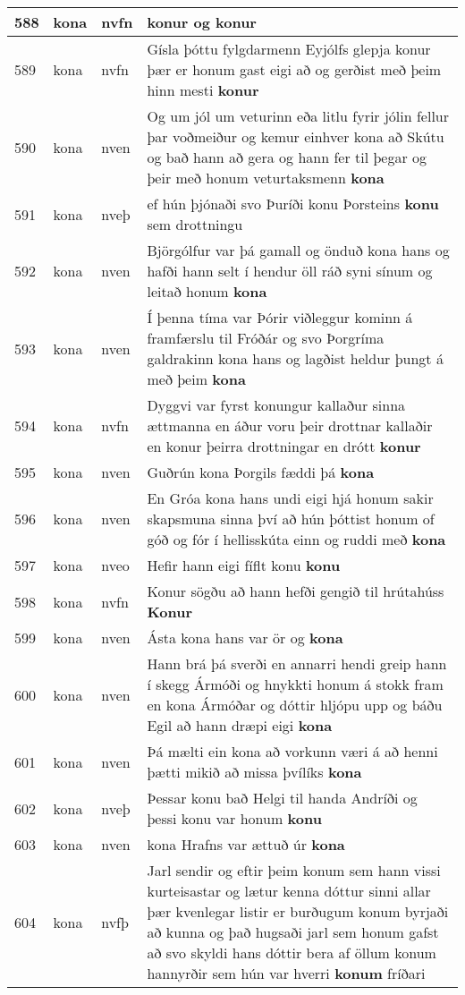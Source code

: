 \documentclass{article}
\begin{document}
\begin{longtable}{p{1cm}|p{1cm}|p{1cm}|p{13cm}}
\hline
588&kona&nvfn& \textbf{konur} og konur\\
\hline
589&kona&nvfn&Gísla þóttu fylgdarmenn Eyjólfs glepja konur þær er honum gast eigi að og gerðist með þeim hinn mesti \textbf{konur} \\
\hline
590&kona&nven&Og um jól um veturinn eða litlu fyrir jólin fellur þar voðmeiður og kemur einhver kona að Skútu og bað hann að gera og hann fer til þegar og þeir með honum veturtaksmenn \textbf{kona} \\
\hline
591&kona&nveþ&ef hún þjónaði svo Þuríði konu Þorsteins \textbf{konu} sem drottningu\\
\hline
592&kona&nven&Björgólfur var þá gamall og önduð kona hans og hafði hann selt í hendur öll ráð syni sínum og leitað honum \textbf{kona} \\
\hline
593&kona&nven&Í þenna tíma var Þórir viðleggur kominn á framfærslu til Fróðár og svo Þorgríma galdrakinn kona hans og lagðist heldur þungt á með þeim \textbf{kona} \\
\hline
594&kona&nvfn&Dyggvi var fyrst konungur kallaður sinna ættmanna en áður voru þeir drottnar kallaðir en konur þeirra drottningar en drótt \textbf{konur} \\
\hline
595&kona&nven&Guðrún kona Þorgils fæddi þá \textbf{kona} \\
\hline
596&kona&nven&En Gróa kona hans undi eigi hjá honum sakir skapsmuna sinna því að hún þóttist honum of góð og fór í hellisskúta einn og ruddi með \textbf{kona} \\
\hline
597&kona&nveo&Hefir hann eigi fíflt konu \textbf{konu} \\
\hline
598&kona&nvfn&Konur sögðu að hann hefði gengið til hrútahúss \textbf{Konur} \\
\hline
599&kona&nven&Ásta kona hans var ör og \textbf{kona} \\
\hline
600&kona&nven&Hann brá þá sverði en annarri hendi greip hann í skegg Ármóði og hnykkti honum á stokk fram en kona Ármóðar og dóttir hljópu upp og báðu Egil að hann dræpi eigi \textbf{kona} \\
\hline
601&kona&nven&Þá mælti ein kona að vorkunn væri á að henni þætti mikið að missa þvílíks \textbf{kona} \\
\hline
602&kona&nveþ&Þessar konu bað Helgi til handa Andríði og þessi konu var honum \textbf{konu} \\
\hline
603&kona&nven&kona Hrafns var ættuð úr \textbf{kona} \\
\hline
604&kona&nvfþ&Jarl sendir og eftir þeim konum sem hann vissi kurteisastar og lætur kenna dóttur sinni allar þær kvenlegar listir er burðugum konum byrjaði að kunna og það hugsaði jarl sem honum gafst að svo skyldi hans dóttir bera af öllum konum hannyrðir sem hún var hverri \textbf{konum} fríðari\\

\end{longtable}
\end{document}
